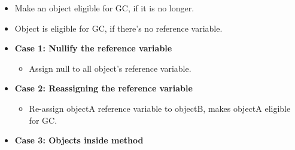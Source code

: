 \setlength{\columnsep}{3pt}
\begin{flushleft}
	
	\begin{itemize}
		\item Make an object eligible for GC, if it is no longer.
		\item Object is eligible for GC, if there's no reference variable.
	\end{itemize}

		\begin{itemize}
			\item \textbf{Case 1: Nullify the reference variable }
			\begin{itemize}
				\item Assign null to all object's reference variable.
			\end{itemize}
			\item \textbf{Case 2: Reassigning the reference variable}
			\begin{itemize}
				\item Re-assign objectA reference variable to objectB, makes objectA eligible for GC.
			\end{itemize}
			\bigskip
			\item \textbf{Case 3: Objects inside method}
			\begin{itemize}

\end{itemize}
\end{itemize}
\end{flushleft}
